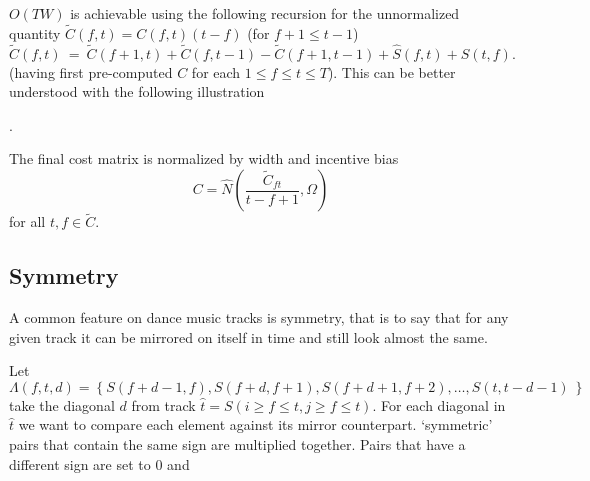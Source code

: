 \documentclass[twocolumn]{article}
\begin{document}
	$O(TW)$ is achievable using the following recursion for the unnormalized quantity $\tilde
	C(f,t) = C(f,t)(t-f)$ (for $f+1 \le t-1$)
	\begin{dmath*}
		\tilde C(f,t) ~=~ \tilde C(f+1,t) + \tilde C(f,t-1) - \tilde C(f+1,t-1) + \hat S(f,t) + \hat S(t,f).
	\end{dmath*} (having first pre-computed $C$ for each $1 \le f \le t \le T$). This can be better understood with the following illustration
	
	\begin{center}
		.
	\end{center} The final cost matrix is normalized by width and incentive bias
\[
C = \hat N \left( \frac{ \tilde C_{ft} }{ t-f+1 }, \Omega \right)
\] for all $t,f \in \tilde C$.
	
	\subsection{Symmetry}	
	
	A common feature on dance music tracks is symmetry, that is to say that for any given track it can be mirrored on itself in time and still look almost the same. 
	
	Let \begin{dmath*}
		\Lambda( f,t,d ) = \left\{ 
		S(f+d-1,f), S(f+d, f+1), S(f+d+1, f+2),\ldots, S(t, t-d-1)
		~ \right\} 
	\end{dmath*}take the diagonal $d$ from track $\hat t= S( i \ge f \le t, j \ge f \le t)$. For each diagonal in $\hat t$ we want to compare each element against its mirror counterpart. `symmetric' pairs that contain the same sign are multiplied together. Pairs that have a different sign are set to $0$ and 
	
\end{document}
